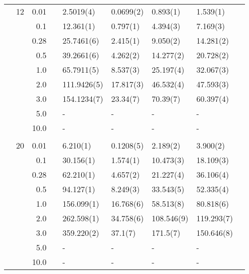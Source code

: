\begin{table}[H]
\begin{tabularx}{\textwidth}{R{1cm}rrcR{2.3cm}R{2.3cm}R{2.3cm}R{2.3cm}R{1cm}}
		&12 & 0.01 && 2.5019(4) & 0.0699(2) & 0.893(1) & 1.539(1) \\
		&& 0.1 && 12.361(1) & 0.797(1) & 4.394(3) & 7.169(3) \\
		&& 0.28 && 25.7461(6) & 2.415(1) & 9.050(2) & 14.281(2) \\
		&& 0.5 && 39.2661(6) & 4.262(2) & 14.277(2) & 20.728(2) \\
		&& 1.0 && 65.7911(5) & 8.537(3) & 25.197(4) & 32.067(3) \\
		&& 2.0 && 111.9426(5) & 17.817(3) & 46.532(4) & 47.593(3) \\
		&& 3.0 && 154.1234(7) & 23.34(7) & 70.39(7) & 60.397(4) \\ 
		&& 5.0 && - & - & - & -\\
		&& 10.0 && - & - & - & -\\
		\hdashline \\
		
		&20 & 0.01 && 6.210(1) & 0.1208(5) & 2.189(2) & 3.900(2) \\
		&& 0.1 && 30.156(1) & 1.574(1) & 10.473(3) & 18.109(3) \\
		&& 0.28 && 62.210(1) & 4.657(2) & 21.227(4) & 36.106(4) \\
		&& 0.5 && 94.127(1) & 8.249(3) & 33.543(5) & 52.335(4) \\
		&& 1.0 && 156.099(1) & 16.768(6) & 58.513(8) & 80.818(6) \\
		&& 2.0 && 262.598(1) & 34.758(6) & 108.546(9) & 119.293(7) \\
		&& 3.0 && 359.220(2) & 37.1(7) & 171.5(7) & 150.646(8) \\ 
		&& 5.0 && - & - & - & -\\
		&& 10.0 && - & - & - & -\\
		\hline \hline
	\end{tabularx}
\end{table} 

